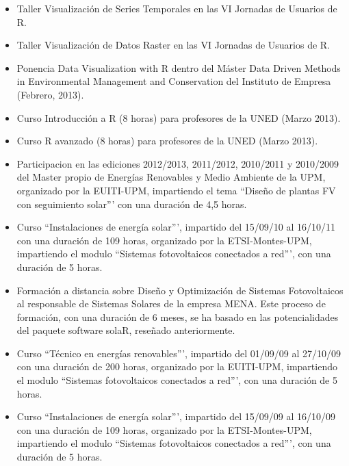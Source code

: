 \documentclass[article, a4paper]{memoir}
\begin{document}
\begin{itemize}
\item Taller \guillemotleft{}Visualización de Series Temporales\guillemotright{} en las VI Jornadas de Usuarios de R.

\item Taller \guillemotleft{}Visualización de Datos Raster\guillemotright{} en las VI Jornadas de Usuarios de R.

\item Ponencia \guillemotleft{}Data Visualization with R\guillemotright{} dentro del Máster \guillemotleft{}Data Driven
Methods in Environmental Management and Conservation\guillemotright{} del Instituto
de Empresa (Febrero, 2013).

\item Curso \guillemotleft{}Introducción a R\guillemotright{} (8 horas) para profesores de la UNED (Marzo
2013).

\item Curso \guillemotleft{}R avanzado\guillemotright{} (8 horas) para profesores de la UNED (Marzo
2013).

\item Participacion en las ediciones 2012/2013, 2011/2012, 2010/2011 y 2010/2009 del Master
propio de Energías Renovables y Medio Ambiente de la UPM,
organizado por la EUITI-UPM, impartiendo el tema ``Diseño de
plantas FV con seguimiento solar''' con una duración de 4,5
horas.

\item Curso ``Instalaciones de energía solar''', impartido del 15/09/10
al 16/10/11 con una duración de 109 horas, organizado por la
ETSI-Montes-UPM, impartiendo el modulo ``Sistemas fotovoltaicos
conectados a red''', con una duración de 5 horas.

\item Formación a distancia sobre Diseño y Optimización de Sistemas
Fotovoltaicos al responsable de Sistemas Solares de la empresa
MENA. Este proceso de formación, con una duración de 6 meses,
se ha basado en las potencialidades del paquete software solaR,
reseñado anteriormente.

\item Curso ``Técnico en energías renovables''', impartido del 01/09/09
al 27/10/09 con una duración de 200 horas, organizado por la
EUITI-UPM, impartiendo el modulo ``Sistemas fotovoltaicos
conectados a red''', con una duración de 5 horas.

\item Curso ``Instalaciones de energía solar''', impartido del 15/09/09
al 16/10/09 con una duración de 109 horas, organizado por la
ETSI-Montes-UPM, impartiendo el modulo ``Sistemas fotovoltaicos
conectados a red''', con una duración de 5 horas.


\end{itemize}
\end{document}
